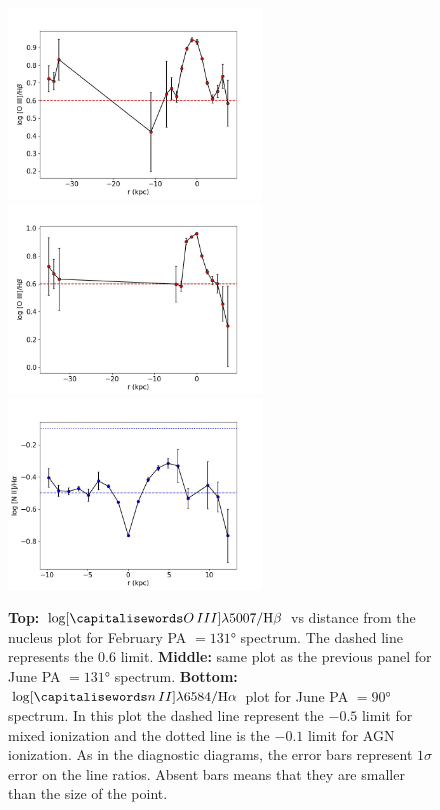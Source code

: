 \documentclass[../thesis.tex]{subfiles}
\begin{document}
\begin{figure}
\centering
\includegraphics[width=0.6\textwidth]{images/paper3/PA131_2016_o3_hb.jpg}\\ 
\includegraphics[width=0.6\textwidth]{images/paper3/PA131_o3_hb.jpg}\\ 
\includegraphics[width=0.6\textwidth]{images/paper3/PA90_n2_ha.jpg}\\ 
\caption[]{\textbf{Top:} $\log [\ion{O}{III}]\lambda5007/\Hb$ vs distance from the nucleus plot for February PA $=\ang{131}$ spectrum. The dashed line represents the $0.6$ limit.
\textbf{Middle:} same plot as the previous panel for June PA $=\ang{131}$ spectrum.
\textbf{Bottom:} $\log [\ion{n}{II}]\lambda6584/\Ha$ plot for June PA $=\ang{90}$ spectrum. In this plot the dashed line represent the $-0.5$ limit for mixed ionization and the dotted line is the $-0.1$ limit for AGN ionization. As in the diagnostic diagrams, the error bars represent $1\sigma$ error on the line ratios. Absent bars means that they are smaller than the size of the point.}
\label{fig:o3hb_ratio}
\end{figure} 
\end{document}
